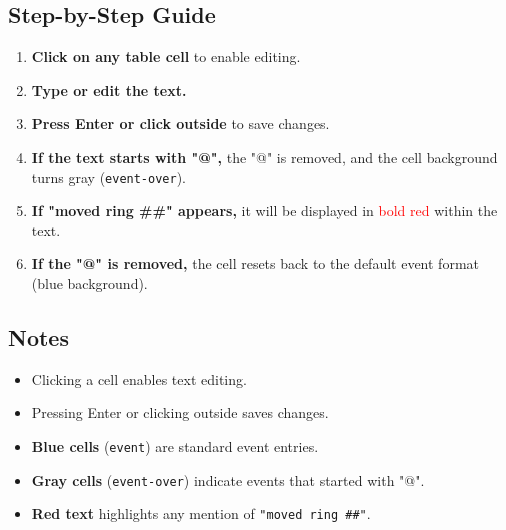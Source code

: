 \documentclass[a4paper,12pt]{article}
\begin{document}
\subsection{Step-by-Step Guide}
\begin{enumerate}
    \item \textbf{Click on any table cell} to enable editing.
    \item \textbf{Type or edit the text.}
    \item \textbf{Press Enter or click outside} to save changes.
    \item \textbf{If the text starts with "@",} the "@" is removed, and the cell background turns gray (\texttt{event-over}).
    \item \textbf{If "moved ring \#\#" appears,} it will be displayed in \textcolor{red}{bold red} within the text.
    \item \textbf{If the "@" is removed,} the cell resets back to the default event format (blue background).
\end{enumerate}

\subsection{Notes}
\begin{itemize}
    \item Clicking a cell enables text editing.
    \item Pressing Enter or clicking outside saves changes.
    \item \textbf{Blue cells} (\texttt{event}) are standard event entries.
    \item \textbf{Gray cells} (\texttt{event-over}) indicate events that started with "@".
    \item \textbf{Red text} highlights any mention of \texttt{"moved ring \#\#"}.
\end{itemize}
\end{document}
